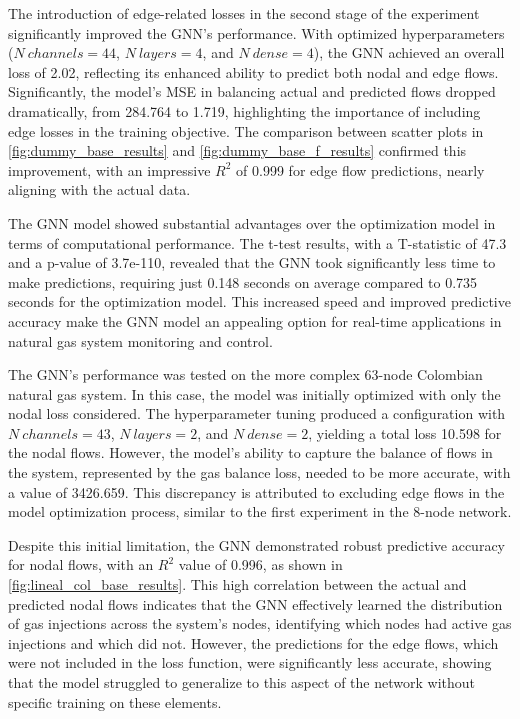 The introduction of edge-related losses in the second stage of the experiment significantly improved the GNN's performance. With optimized hyperparameters ($N\ channels=44$, $N\ layers=4$, and $N\ dense=4$), the GNN achieved an overall loss of 2.02, reflecting its enhanced ability to predict both nodal and edge flows. Significantly, the model's MSE in balancing actual and predicted flows dropped dramatically, from 284.764 to 1.719, highlighting the importance of including edge losses in the training objective. The comparison between scatter plots in \cref{fig:dummy_base_results} and \cref{fig:dummy_base_f_results} confirmed this improvement, with an impressive $R^2$ of 0.999 for edge flow predictions, nearly aligning with the actual data.

The GNN model showed substantial advantages over the optimization model in terms of computational performance. The t-test results, with a T-statistic of 47.3 and a p-value of 3.7e-110, revealed that the GNN took significantly less time to make predictions, requiring just 0.148 seconds on average compared to 0.735 seconds for the optimization model. This increased speed and improved predictive accuracy make the GNN model an appealing option for real-time applications in natural gas system monitoring and control.





The GNN's performance was tested on the more complex 63-node Colombian natural gas system. In this case, the model was initially optimized with only the nodal loss considered. The hyperparameter tuning produced a configuration with $N\ channels=43$, $N\ layers=2$, and $N\ dense=2$, yielding a total loss 10.598 for the nodal flows. However, the model's ability to capture the balance of flows in the system, represented by the gas balance loss, needed to be more accurate, with a value of 3426.659. This discrepancy is attributed to excluding edge flows in the model optimization process, similar to the first experiment in the 8-node network.


Despite this initial limitation, the GNN demonstrated robust predictive accuracy for nodal flows, with an $R^2$ value of 0.996, as shown in \cref{fig:lineal_col_base_results}. This high correlation between the actual and predicted nodal flows indicates that the GNN effectively learned the distribution of gas injections across the system's nodes, identifying which nodes had active gas injections and which did not. However, the predictions for the edge flows, which were not included in the loss function, were significantly less accurate, showing that the model struggled to generalize to this aspect of the network without specific training on these elements.

